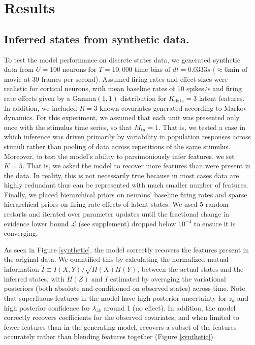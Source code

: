 \documentclass{nature}
\begin{document}
\section*{Results}
\subsection{Inferred states from synthetic data.}
To test the model performance on discrete states data, we generated synthetic data from $U=100$ neurons for $T=10,000$ time bins of $dt=0.0333s$ ($\approx 6$min of movie at 30 frames per second). Assumed firing rates and effect sizes were realistic for cortical neurons, with mean baseline rates of 10 spikes/s and firing rate effects given by a $\text{Gamma}(1, 1)$ distribution for $K_{\text{data}}=3$ latent features. In addition, we included $R=3$ known covariates generated according to Markov dynamics. For this experiment, we assumed that each unit was presented only once with the stimulus time series, so that $M_{tu} = 1$. That is, we tested a case in which inference was driven primarily by variability in population responses across stimuli rather than pooling of data across repetitions of the same stimulus. Moreover, to test the model's ability to parsimoniously infer features, we set $K=5$. That is, we asked the model to recover more features than were present in the data. In reality, this is not necessarily true because in most cases data are highly redundant thus can be represented with much smaller number of features. Finally, we placed hierarchical priors on neurons' baseline firing rates and sparse hierarchical priors on firing rate effects of latent states. We used 5 random restarts and iterated over parameter updates until the fractional change in evidence lower bound $\mathcal{L}$ (see supplement) dropped below $10^{-4}$ to ensure it is converging.

As seen in Figure \ref{synthetic}, the model correctly recovers the features present in the original data. We quantified this by calculating the normalized mutual information $\hat{I}\equiv I(X, Y)/\sqrt{H(X)H(Y)}$, between the actual states and the inferred states, with $H(Z)$ and $I$ estimated by averaging the variational posteriors (both absolute and conditioned on observed states) across time. Note that superfluous features in the model have high posterior uncertainty for $z_k$ and high posterior confidence for $\lambda_{zk}$ around 1 (no effect). In addition, the model correctly recovers coefficients for the observed covariates, and when limited to fewer features than in the generating model, recovers a subset of the features accurately rather than blending features together (Figure \ref{synthetic}).
\end{document}

